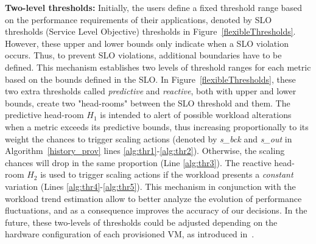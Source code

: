 
\textbf{Two-level thresholds:} Initially, the users define a fixed
threshold range based on the performance requirements of their
applications, denoted by SLO thresholds (Service Level Objective)
thresholds in Figure~\ref{flexibleThresholds}. However, these upper
and lower bounds only indicate when a SLO violation occurs. Thus, to
prevent SLO violations, additional boundaries have to be defined. This
mechanism establishes two levels of threshold ranges for each metric
based on the bounds defined in the SLO. In
Figure~\ref{flexibleThresholds}, these two extra thresholds called
\emph{predictive} and \emph{reactive}, both with upper and lower
bounds, create two "head-rooms" between the SLO threshold and
them. The predictive head-room $H_1$ is intended to alert of possible
workload alterations when a metric exceeds its predictive bounds, thus
increasing proportionally to its weight the chances to trigger scaling
actions (denoted by \emph{s\_bck} and \emph{s\_out} in
Algorithm~\ref{history_prov} lines
\ref{alg:thr1}-\ref{alg:thr2}). Otherwise, the scaling chances will
drop in the same proportion (Line \ref{alg:thr3}). The reactive
head-room $H_2$ is used to trigger scaling actions if the workload
presents a \emph{constant} variation (Lines
\ref{alg:thr4}-\ref{alg:thr5}). This mechanism in conjunction with the
workload trend estimation allow to better analyze the evolution of
performance fluctuations, and as a consequence improves the accuracy
of our decisions. In the future, these two-levels of thresholds could
be adjusted depending on the hardware configuration of each
provisioned VM, as introduced in~\cite{beloglazov_adaptive_2010}.


